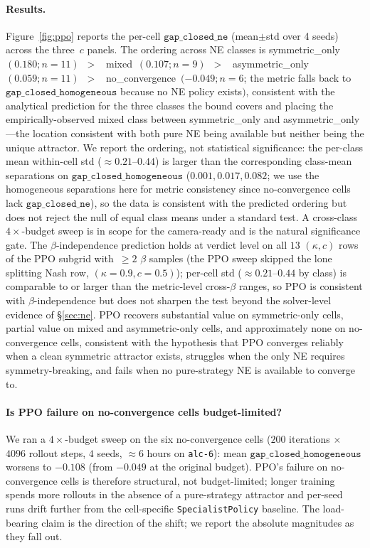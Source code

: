 \documentclass{anvil-paper}
\begin{document}
\paragraph{Results.}
Figure~\ref{fig:ppo} reports the per-cell $\texttt{gap\_closed\_ne}$
(mean$\pm$std over 4 seeds) across the three~$c$ panels. The ordering across
NE classes is
\textsf{symmetric\_only}~$(0.180;n{=}11)$~$>$~%
\textsf{mixed}~$(0.107;n{=}9)$~$>$~%
\textsf{asymmetric\_only}~$(0.059;n{=}11)$~$>$~%
\textsf{no\_convergence}~$(-0.049;n{=}6$; the metric falls back to
$\texttt{gap\_closed\_homogeneous}$ because no NE policy exists$)$,
consistent with the analytical prediction for the three classes the
bound covers and placing the empirically-observed \textsf{mixed} class
between \textsf{symmetric\_only} and \textsf{asymmetric\_only}---the
location consistent with both pure NE being available but neither being
the unique attractor. We report the ordering, not statistical
significance: the per-class mean within-cell std
($\approx 0.21$--$0.44$) is larger than the corresponding
class-mean separations on $\texttt{gap\_closed\_homogeneous}$
($0.001, 0.017, 0.082$; we use the homogeneous separations here for
metric consistency since no-convergence cells lack
$\texttt{gap\_closed\_ne}$), so the data is consistent with the
predicted ordering but does not reject the null of equal class means
under a standard test. A cross-class $4{\times}$-budget sweep is in
scope for the camera-ready and is the natural significance gate. The $\beta$-independence prediction holds at verdict
level on all $13$ $(\kappa,c)$ rows of the PPO subgrid with~$\geq 2$ $\beta$ samples (the PPO sweep skipped the lone splitting Nash row, $(\kappa{=}0.9, c{=}0.5)$); per-cell
std ($\approx 0.21$--$0.44$ by class) is comparable to or larger than the
metric-level cross-$\beta$ ranges, so PPO is consistent with
$\beta$-independence but does not sharpen the test beyond the
solver-level evidence of \S\ref{sec:ne}. PPO recovers substantial value on
symmetric-only cells, partial value on mixed and asymmetric-only cells,
and approximately none on no-convergence cells, consistent with the
hypothesis that PPO converges reliably when a clean symmetric attractor
exists, struggles when the only NE requires symmetry-breaking, and fails
when no pure-strategy NE is available to converge to.

\paragraph{Is PPO failure on no-convergence cells budget-limited?}
We ran a $4{\times}$-budget sweep on the six no-convergence cells
($200$ iterations $\times$ $4096$ rollout steps, $4$ seeds, $\approx 6$ hours
on \texttt{alc-6}): mean $\texttt{gap\_closed\_homogeneous}$ worsens to
$-0.108$ (from $-0.049$ at the original budget). PPO's failure on
no-convergence cells is therefore structural, not budget-limited; longer
training spends more rollouts in the absence of a pure-strategy attractor
and per-seed runs drift further from the cell-specific
\texttt{SpecialistPolicy} baseline. The load-bearing claim is the direction
of the shift; we report the absolute magnitudes as they fall out.
\end{document}
